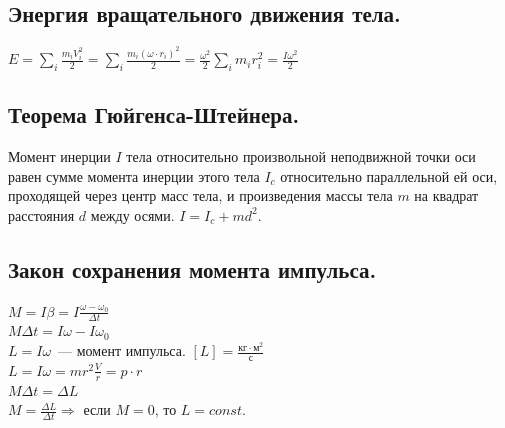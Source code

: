 \documentclass[12pt]{article}
\begin{document}
	\subsection{Энергия вращательного движения тела.}
	$E = \sum \limits_i \frac{m_iV_i^2}{2} = \sum \limits_i \frac{m_i(\omega \cdot r_i)^2}{2} = \frac{\omega^2}{2} \sum \limits_i m_ir_i^2 = \frac{I\omega^2}{2}$
	\subsection{Теорема Гюйгенса-Штейнера.}
	\begin{theorem}
		Момент инерции $I$ тела относительно произвольной неподвижной точки оси равен сумме момента инерции этого тела $I_c$ относительно параллельной ей оси, проходящей через центр масс тела, и произведения массы тела $m$ на квадрат расстояния $d$ между осями. $I = I_c + md^2$.
	\end{theorem}
	\subsection{Закон сохранения момента импульса.}
	$M = I \beta = I \frac{\omega - \omega_0}{\varDelta t}$ \\
	$M \varDelta t = I \omega - I \omega_0$ \\
	$L = I \omega$~--- момент импульса. $[L] = \frac{\text{кг} \cdot \text{м}^2}{\text{с}}$ \\
	$L = I \omega = m r^2 \frac{V}{r} = p \cdot r$ \\
	$M \varDelta t = \varDelta L$ \\
	$M = \frac{\varDelta L}{\varDelta t} \Rightarrow$ если $M = 0$, то $L = const$.
\end{document}
